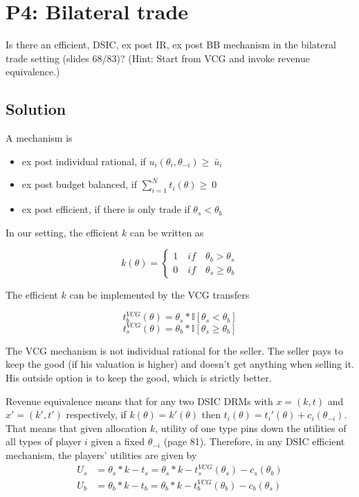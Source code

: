 \documentclass{article}
\newcommand{\enterProblemHeader}[1]{
\nobreak\extramarks{#1}{#1 continued on next page\ldots}\nobreak
\nobreak\extramarks{#1 (continued)}{#1 continued on next page\ldots}\nobreak
}
\newcommand{\exitProblemHeader}[1]{
\nobreak\extramarks{#1 (continued)}{#1 continued on next page\ldots}\nobreak
\nobreak\extramarks{#1}{}\nobreak
}
\newcounter{homeworkProblemCounter} %
\newcommand{\homeworkProblemName}{}
\newenvironment{ex}[1][Problem \arabic{homeworkProblemCounter}]{ %
\stepcounter{homeworkProblemCounter} %
\renewcommand{\homeworkProblemName}{#1} %
\section{\homeworkProblemName} %
}{
}
\newif\ifsolutions
\begin{document}
\begin{ex}[P4: Bilateral trade]
	Is there an efficient, DSIC, ex post IR, ex post BB mechanism in the bilateral trade setting (slides 68/83)? (Hint: Start from VCG and invoke revenue equivalence.)
	
	\ifsolutions
	\subsection*{Solution}
	A mechanism is 
	
	\begin{itemize}
		\item ex post individual rational, if $u_i(\theta_i,\theta_{-i}) \geq\ \bar{u}_i$
		
		\item ex post budget balanced, if $\sum_{i=1}^{N} t_i(\theta) \geq\ 0 $
		
		\item ex post efficient, if there is only trade if $\theta_s<\theta_b$
		
	\end{itemize}
	
	In our setting, the efficient $k$ can be written as
	
	$$k(\theta)= \begin{cases} 1 \quad if \quad \theta_b > \theta_s \\ 0 \quad if \quad \theta_s \geq \theta_b \end{cases} $$
	
	The efficient $k$ can be implemented by the VCG transfers 
	
	$$t_b^{VCG}(\theta)=\theta_s*\mathbb{I} [\theta_s < \theta_b]$$
	$$t_s^{VCG}(\theta)=\theta_b*\mathbb{I} [\theta_s \geq \theta_b]$$
	
	The VCG mechanism is not individual rational for the seller.
	The seller pays to keep the good (if his valuation is higher) and doesn't get anything when selling it. His outside option is to keep the good, which is strictly better.
	
	Revenue equivalence means that for any two DSIC DRMs with $x=(k,t)$ and $x'=(k',t')$ respectively, if $k(\theta)=k'(\theta)$ then $t_i(\theta)=t_i'(\theta)+c_i(\theta_{-i})$.
	That means that given allocation $k$, utility of one type pins down the utilities of all types of player $i$ given a fixed $\theta_{-i}$ (page 81).
	Therefore, in any DSIC efficient mechanism, the players' utilities are given by 
	\begin{align*}
		U_s &= \theta_s*k-t_s = \theta_s*k-t_s^{VCG}(\theta_s)-c_s(\theta_b)
		\\
		U_b &= \theta_b*k-t_b = \theta_b*k-t_b^{VCG}(\theta_b)-c_b(\theta_s)
	\end{align*}
	

\end{ex}
\end{document}
